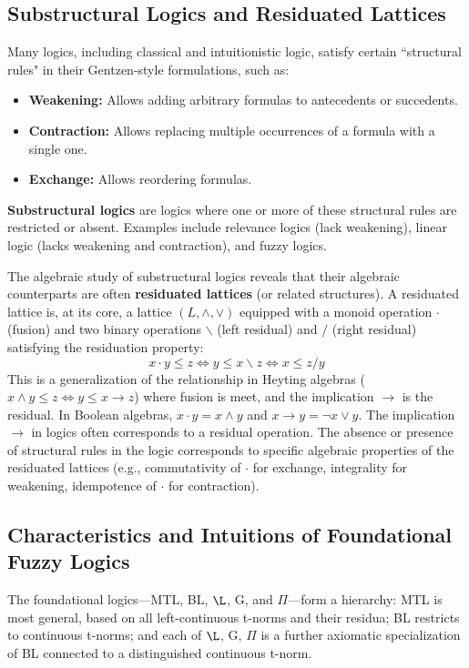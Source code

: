 \subsection{Substructural Logics and Residuated Lattices}

Many logics, including classical and intuitionistic logic, satisfy certain ``structural rules" in their Gentzen-style formulations, such as:
\begin{itemize}
    \item \textbf{Weakening:} Allows adding arbitrary formulas to antecedents or succedents.
    \item \textbf{Contraction:} Allows replacing multiple occurrences of a formula with a single one.
    \item \textbf{Exchange:} Allows reordering formulas.
\end{itemize}
\textbf{Substructural logics} are logics where one or more of these structural rules are restricted or absent. Examples include relevance logics (lack weakening), linear logic (lacks weakening and contraction), and fuzzy logics.

The algebraic study of substructural logics reveals that their algebraic counterparts are often \textbf{residuated lattices} (or related structures).
A residuated lattice is, at its core, a lattice $(L, \land, \lor)$ equipped with a monoid operation $\cdot$ (fusion) and two binary operations $\backslash$ (left residual) and $/$ (right residual) satisfying the residuation property:
\[ x \cdot y \le z \iff y \le x \backslash z \iff x \le z / y \]
This is a generalization of the relationship in Heyting algebras ($x \land y \le z \iff y \le x \to z$) where fusion is meet, and the implication $\to$ is the residual. In Boolean algebras, $x \cdot y = x \land y$ and $x \to y = \neg x \lor y$. The implication $\to$ in logics often corresponds to a residual operation.
The absence or presence of structural rules in the logic corresponds to specific algebraic properties of the residuated lattices (e.g., commutativity of $\cdot$ for exchange, integrality for weakening, idempotence of $\cdot$ for contraction).



\subsection{Characteristics and Intuitions of Foundational Fuzzy Logics}

The foundational logics—MTL, BL, $\L$, G, and $\Pi$—form a hierarchy: MTL is most general, based on all left-continuous t-norms and their residua; BL restricts to continuous t-norms; and each of $\L$, G, $\Pi$ is a further axiomatic specialization of BL connected to a distinguished continuous t-norm.

